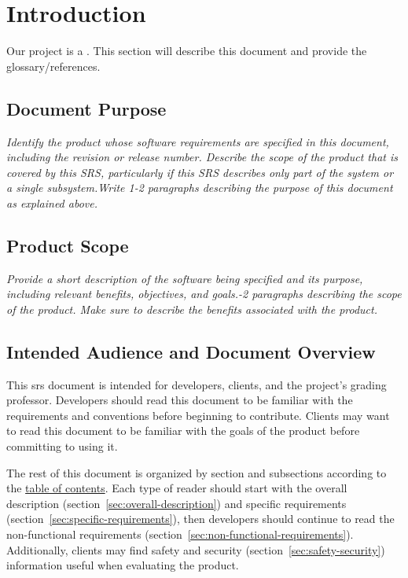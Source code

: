 
\section{Introduction}
    Our project is a \todo. This section will describe this document and provide the glossary/references.
    \subsection{Document Purpose}
        \emph{Identify the product whose software requirements are specified in this document, including the revision or release number. Describe the scope of the product that is covered by this SRS, particularly if this SRS describes only part of the system or a single subsystem.\gnl Write 1-2 paragraphs describing the purpose of this document as explained above.}
    \subsection{Product Scope}
        \emph{Provide a short description of the software being specified and its purpose, including relevant benefits, objectives, and goals.-2 paragraphs describing the scope of the product. Make sure to describe the benefits associated with the product.}
    \subsection{Intended Audience and Document Overview}
        This \gls{srs} document is intended for developers, clients, and the project's grading professor. Developers should read this document to be familiar with the requirements and conventions before beginning to contribute. Clients may want to read this document to be familiar with the goals of the product before committing to using it.
        \par The rest of this document is organized by section and subsections according to the \hyperref[toc]{table of contents}. Each type of reader should start with the overall description (section~\ref{sec:overall-description}) and specific requirements (section~\ref{sec:specific-requirements}), then developers should continue to read the non-functional requirements (section~\ref{sec:non-functional-requirements}). Additionally, clients may find safety and security (section~\ref{sec:safety-security}) information useful when evaluating the product.
